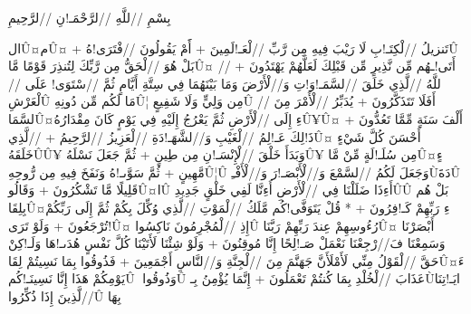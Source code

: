 \documentclass[12pt]{book}
\begin{document}
\newpage
{}
\chead{\qframe}
\fancyfoot{}
\setquran
{}
\begin{RLtext}
\Large
\centerline{ بِسْمِ //للَّهِ //لرَّحْمَـ!نِ //لرَّحِيمِ }
\noindent
ال^^db^^a4م^^db^^a4 + تَنزيلُ //لْكِتَـ!بِ لَا رَيْبَ فِيهِ مِن رَّبِّ //لْعَـ!لَمِينَ + أََمْ يَقُولُونَ //فْتَرَى!هُ^^db^^9a بَلْ هُوَ //لْحَقُّ مِن رَّبِّكَ لِتُنذِرَ قَوْمًا مَّا^^db^^a4 أَتَى!ـهُم مِّن نَّذِيرٍ مِّن قَبْلِكَ لَعَلَّهُمْ يَهْتَدُونَ + //للَّهُ //لَّذِي خَلَقَ //لسَّمَـ!وَ!تِ وَ//لْأَرْضَ وَمَا بَيْنَهُمَا فِي سِتَّةِ  أَيَّامٍ ثُمَّ //سْتَوَى! عَلَى //لْعَرْشِ^^db^^96 مَا لَكُم مِّن دُونِهِ^^db^^a6 مِن وَلِيٍّ وَلَا شَفِيعٍ^^db^^9a أَفَلَا تَتَذَكَّرُونَ + يُدَبِّرُ //لْأَمْرَ مِنَ //لسَّمَا^^db^^a4ءِ إِلَى //لْأَرْضِ ثُمَّ يَعْرُجُ إِلَيْهِ فِي يَوْمٍ كَانَ مِقْدَارُهُ^^db^^a5^^db^^a4 أَلْفَ سَنَةٍ مِّمَّا تَعُدُّونَ + ذَ!لِكَ عَـ!لِمُ //لْغَيْبِ وَ//لشَّهَـ!دَةِ //لْعَزِيزُ //لرَّحِيمُ + //لَّذِي^^db^^a4 أَحْسَنَ كُلَّ شَيْءٍ خَلَقَهُ^^db^^96^^db^^a5 وَبَدَأَ خَلْقَ //لْإِنْسَـ!نِ مِن طِينٍ + ثُمَّ جَعَلَ نَسْلَهُ^^db^^a5 مِن سُلَـ!لَةٍ مِّنْ مَّا^^db^^a4ءٍ مَّهِينٍ + ثُمَّ سَوَّىـ!هُ وَنَفَخَ فِيهِ مِن رُّوحِهِ^^db^^a6^^db^^96 وَجَعَلَ لَكُمُ //لسَّمْعَ وَ//لْأَبْصَـ!رَ وَ//لْأَفْـِ^^d9^^94دَةَ^^db^^9a قَلِيلًا مَّا تَشْكُرُونَ + وَقَالُو^^db^^a4ا^^db^^9f أَءِذَا ضَلَلْنَا فِي //لْأَرْضِ أَءِنَّا لَفِي خَلْقٍ جَدِيدِ^^db^^9a^^db^^ad  بَلْ هُم بِلِقَا^^db^^a4ءِ رَبِّهِمْ كَـ!فِرُونَ + * قُلْ يَتَوَفَّى!كُم مَّلَكُ //لْمَوْتِ //لَّذِي وُكِّلَ بِكُمْ ثُمَّ إِلَى رَبِّكُمْ تُرْجَعُونَ +  وَلَوْ تَرَى!^^db^^a4 إِذِ //لْمُجْرِمُونَ نَاكِسُوا^^db^^9f رُءُوسِهِمْ عِندَ رَبِّهِمْ رَبَّنَا^^db^^a4 أَبْصَرْنَا وَسَمِعْنَا فَ//رْجِعْنَا نَعْمَلْ صَـ!لِحًا إِنَّا مُوقِنُونَ + وَلَوْ شِئْنَا لَأَتَيْنَا كُلَّ نَفْسٍ هُدَىـ!هَا وَلَـ!كِنْ حَقَّ //لْقَوْلُ مِنِّي لَأَمْلَأَنَّ جَهَنَّمَ مِنَ //لْجِنَّةِ وَ//لنَّاسِ أَجْمَعِينَ + فَذُوقُوا بِمَا نَسِيتُمْ لِقَا^^db^^a4ءَ يَوْمِكُمْ هَذَا إِنَّا نَسِينَـ!كُم^^db^^96ْْ وَذُوقُوا^^db^^9f عَذَابَ //لْخُلْدِ بِمَا كُنتُمْ تَعْمَلُونَ + إِنَّمَا يُؤْمِنُ بِـ^^d9^^94ايَـ!تِنَا //لَّذِينَ إِذَا ذُكِّرُوا^^db^^9f بِهَا 

\end{RLtext}
\end{document}
